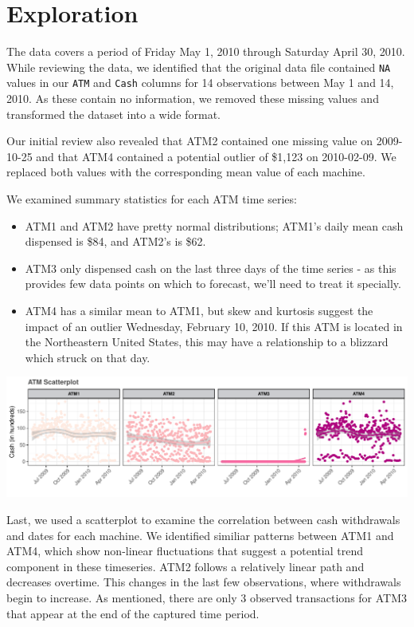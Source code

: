 \documentclass[openany]{book}
\providecommand{\tightlist}{%
  \setlength{\itemsep}{0pt}\setlength{\parskip}{0pt}}
\begin{document}
\hypertarget{exploration}{%
\section{Exploration}\label{exploration}}

The data covers a period of Friday May 1, 2010 through Saturday April
30, 2010. While reviewing the data, we identified that the original data
file contained \texttt{NA} values in our \texttt{ATM} and \texttt{Cash}
columns for 14 observations between May 1 and 14, 2010. As these contain
no information, we removed these missing values and transformed the
dataset into a wide format.

Our initial review also revealed that ATM2 contained one missing value
on 2009-10-25 and that ATM4 contained a potential outlier of \$1,123 on
2010-02-09. We replaced both values with the corresponding mean value of
each machine.

We examined summary statistics for each ATM time series:

\begin{itemize}
\tightlist
\item
  ATM1 and ATM2 have pretty normal distributions; ATM1's daily mean cash
  dispensed is \$84, and ATM2's is \$62.
\item
  ATM3 only dispensed cash on the last three days of the time series -
  as this provides few data points on which to forecast, we'll need to
  treat it specially.
\item
  ATM4 has a similar mean to ATM1, but skew and kurtosis suggest the
  impact of an outlier Wednesday, February 10, 2010. If this ATM is
  located in the Northeastern United States, this may have a
  relationship to a blizzard which struck on that day.
\end{itemize}

\includegraphics{Part-A-JM_JO_files/figure-latex/unnamed-chunk-3-1.pdf}

Last, we used a scatterplot to examine the correlation between cash
withdrawals and dates for each machine. We identified similiar patterns
between ATM1 and ATM4, which show non-linear fluctuations that suggest a
potential trend component in these timeseries. ATM2 follows a relatively
linear path and decreases overtime. This changes in the last few
observations, where withdrawals begin to increase. As mentioned, there
are only 3 observed transactions for ATM3 that appear at the end of the
captured time period.
\end{document}
